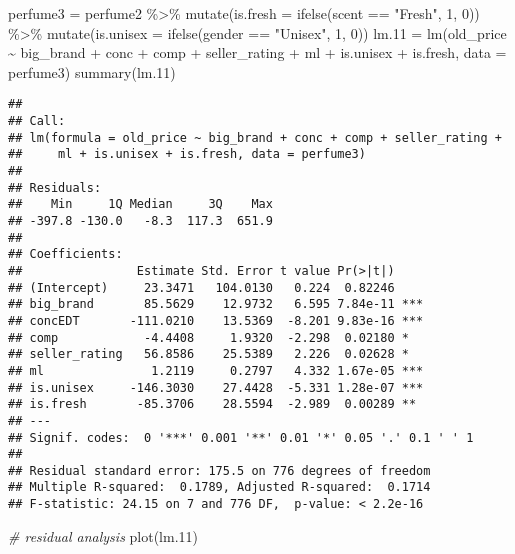 \documentclass[
]{article}
\newenvironment{Shaded}{\begin{snugshade}}{\end{snugshade}}
\newcommand{\AttributeTok}[1]{\textcolor[rgb]{0.77,0.63,0.00}{#1}}
\newcommand{\CommentTok}[1]{\textcolor[rgb]{0.56,0.35,0.01}{\textit{#1}}}
\newcommand{\DecValTok}[1]{\textcolor[rgb]{0.00,0.00,0.81}{#1}}
\newcommand{\FloatTok}[1]{\textcolor[rgb]{0.00,0.00,0.81}{#1}}
\newcommand{\FunctionTok}[1]{\textcolor[rgb]{0.00,0.00,0.00}{#1}}
\newcommand{\NormalTok}[1]{#1}
\newcommand{\OtherTok}[1]{\textcolor[rgb]{0.56,0.35,0.01}{#1}}
\newcommand{\SpecialCharTok}[1]{\textcolor[rgb]{0.00,0.00,0.00}{#1}}
\newcommand{\StringTok}[1]{\textcolor[rgb]{0.31,0.60,0.02}{#1}}
\begin{document}
\begin{Shaded}
\begin{Highlighting}[]
\NormalTok{perfume3 }\OtherTok{=}\NormalTok{ perfume2 }\SpecialCharTok{\%\textgreater{}\%}
  \FunctionTok{mutate}\NormalTok{(}\AttributeTok{is.fresh =} \FunctionTok{ifelse}\NormalTok{(scent }\SpecialCharTok{==} \StringTok{"Fresh"}\NormalTok{, }\DecValTok{1}\NormalTok{, }\DecValTok{0}\NormalTok{)) }\SpecialCharTok{\%\textgreater{}\%}
  \FunctionTok{mutate}\NormalTok{(}\AttributeTok{is.unisex =} \FunctionTok{ifelse}\NormalTok{(gender }\SpecialCharTok{==} \StringTok{"Unisex"}\NormalTok{, }\DecValTok{1}\NormalTok{, }\DecValTok{0}\NormalTok{))}
\NormalTok{lm}\FloatTok{.11} \OtherTok{=} \FunctionTok{lm}\NormalTok{(old\_price }\SpecialCharTok{\textasciitilde{}}\NormalTok{ big\_brand }\SpecialCharTok{+}\NormalTok{ conc }\SpecialCharTok{+}\NormalTok{ comp }\SpecialCharTok{+}\NormalTok{ seller\_rating }\SpecialCharTok{+}\NormalTok{ ml }\SpecialCharTok{+}\NormalTok{ is.unisex }\SpecialCharTok{+}\NormalTok{ is.fresh, }\AttributeTok{data =}\NormalTok{ perfume3)}
\FunctionTok{summary}\NormalTok{(lm}\FloatTok{.11}\NormalTok{)}
\end{Highlighting}
\end{Shaded}

\begin{verbatim}
## 
## Call:
## lm(formula = old_price ~ big_brand + conc + comp + seller_rating + 
##     ml + is.unisex + is.fresh, data = perfume3)
## 
## Residuals:
##    Min     1Q Median     3Q    Max 
## -397.8 -130.0   -8.3  117.3  651.9 
## 
## Coefficients:
##                Estimate Std. Error t value Pr(>|t|)    
## (Intercept)     23.3471   104.0130   0.224  0.82246    
## big_brand       85.5629    12.9732   6.595 7.84e-11 ***
## concEDT       -111.0210    13.5369  -8.201 9.83e-16 ***
## comp            -4.4408     1.9320  -2.298  0.02180 *  
## seller_rating   56.8586    25.5389   2.226  0.02628 *  
## ml               1.2119     0.2797   4.332 1.67e-05 ***
## is.unisex     -146.3030    27.4428  -5.331 1.28e-07 ***
## is.fresh       -85.3706    28.5594  -2.989  0.00289 ** 
## ---
## Signif. codes:  0 '***' 0.001 '**' 0.01 '*' 0.05 '.' 0.1 ' ' 1
## 
## Residual standard error: 175.5 on 776 degrees of freedom
## Multiple R-squared:  0.1789, Adjusted R-squared:  0.1714 
## F-statistic: 24.15 on 7 and 776 DF,  p-value: < 2.2e-16
\end{verbatim}

\begin{Shaded}
\begin{Highlighting}[]
\CommentTok{\# residual analysis}
\FunctionTok{plot}\NormalTok{(lm}\FloatTok{.11}\NormalTok{)}
\end{Highlighting}
\end{Shaded}
\end{document}
